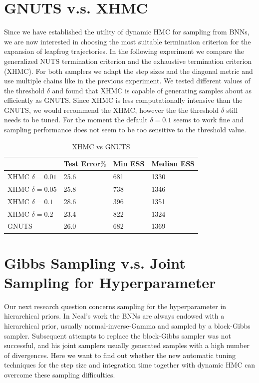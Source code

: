 \documentclass[12pt]{report}
\begin{document}
\section{GNUTS v.s. XHMC}
\label{sec:xhmc}
Since we have established the utility of dynamic HMC for sampling from BNNs, we are now interested in choosing the most suitable termination criterion for the expansion of leapfrog trajectories.  In the following experiment we compare the generalized NUTS termination criterion and the exhaustive termination criterion (XHMC). For both samplers we adapt the step sizes and the diagonal metric and use multiple chains like in the previous experiment. We tested different values of the threshold $\delta$ and found that XHMC is capable of generating samples about as efficiently as GNUTS. Since XHMC is less computationally intensive than the GNUTS, we would recommend the XHMC, however the the threshold $\delta$ still needs to be tuned. For the moment the default $\delta=0.1$ seems to work fine and sampling performance does not seem to be too sensitive to the threshold value. 

\begin{table}[]
\centering
\begin{tabular}{@{}llll@{}}
\toprule
          & Test Error$\%$ & Min ESS & Median ESS \\ \midrule
XHMC $\delta=0.01$  & 25.6       & 681     & 1330       \\ \midrule
XHMC $\delta=0.05$  & 25.8       & 738     & 1346       \\ \midrule
XHMC $\delta=0.1$ & 28.6       & 396     & 1351       \\ \midrule
XHMC $\delta=0.2$ & 23.4       & 822    & 1324        \\ \midrule
GNUTS     & 26.0       & 682     & 1369       \\ \bottomrule
\end{tabular}
\caption{XHMC vs GNUTS}
\label{my-label}
\end{table}


\section{Gibbs Sampling v.s. Joint Sampling for Hyperparameter}
\label{sec:hyperparameter}
Our next research question concerns sampling for the hyperparameter in hierarchical priors. In Neal's work \cite{neal2012bayesian} the BNNs are always endowed with a hierarchical prior, usually normal-inverse-Gamma and sampled by a block-Gibbs sampler. Subsequent attempts to replace the block-Gibbs sampler \cite{choo2000learning} was not successful, and his joint samplers usually generated samples with a high number of divergences. Here we want to find out whether the new automatic tuning techniques for the step size and integration time together with dynamic HMC can overcome these sampling difficulties.
\end{document}
